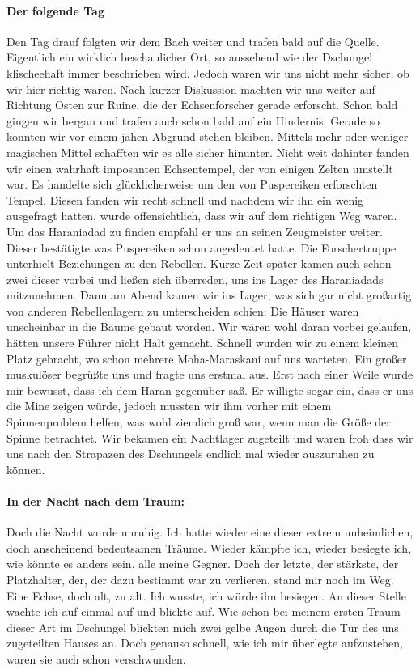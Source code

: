 \paragraph{Der folgende Tag}
Den Tag drauf folgten wir dem Bach weiter und trafen bald auf die Quelle. Eigentlich ein wirklich beschaulicher Ort, so aussehend wie der Dschungel klischeehaft immer beschrieben wird. Jedoch waren wir uns nicht mehr sicher, ob wir hier richtig waren. Nach kurzer Diskussion machten wir uns weiter auf Richtung Osten zur Ruine, die der Echsenforscher gerade erforscht. Schon bald gingen wir bergan und trafen auch schon bald auf ein Hindernis. Gerade so konnten wir vor einem jähen Abgrund stehen bleiben. Mittels mehr oder weniger magischen Mittel schafften wir es alle sicher hinunter. Nicht weit dahinter fanden wir einen wahrhaft imposanten Echsentempel, der von einigen Zelten umstellt war. Es handelte sich glücklicherweise um den von Puspereiken erforschten Tempel. Diesen fanden wir recht schnell und nachdem wir ihn ein wenig ausgefragt hatten, wurde offensichtlich, dass wir auf dem richtigen Weg waren. Um das Haraniadad zu finden empfahl er uns an seinen Zeugmeister weiter. Dieser bestätigte was Puspereiken schon angedeutet hatte. Die Forschertruppe unterhielt Beziehungen zu den Rebellen. Kurze Zeit später kamen auch schon zwei dieser vorbei und ließen sich überreden, uns ins Lager des Haraniadads mitzunehmen. Dann am Abend kamen wir ins Lager, was sich gar nicht großartig von anderen Rebellenlagern zu unterscheiden schien: Die Häuser waren unscheinbar in die Bäume gebaut worden. Wir wären wohl daran vorbei gelaufen, hätten unsere Führer nicht Halt gemacht. Schnell wurden wir zu einem kleinen Platz gebracht, wo schon mehrere Moha-Maraskani auf uns warteten. Ein großer muskulöser begrüßte uns und fragte uns erstmal aus. Erst nach einer Weile wurde mir bewusst, dass ich dem Haran gegenüber saß. Er willigte sogar ein, dass er uns die Mine zeigen würde, jedoch mussten wir ihm vorher mit einem Spinnenproblem helfen, was wohl ziemlich groß war, wenn man die Größe der Spinne betrachtet. Wir bekamen ein Nachtlager zugeteilt und waren froh dass wir uns nach den Strapazen des Dschungels endlich mal wieder auszuruhen zu können.

\paragraph{In der Nacht nach dem Traum:}
Doch die Nacht wurde unruhig. Ich hatte wieder eine dieser extrem unheimlichen, doch anscheinend bedeutsamen Träume. Wieder kämpfte ich, wieder besiegte ich, wie könnte es anders sein, alle meine Gegner. Doch der letzte, der stärkste, der Platzhalter, der, der dazu bestimmt war zu verlieren, stand mir noch im Weg. Eine Echse, doch alt, zu alt. Ich wusste, ich würde ihn besiegen.
An dieser Stelle wachte ich auf einmal auf und blickte auf. Wie schon bei meinem ersten Traum dieser Art im Dschungel blickten mich zwei gelbe Augen durch die Tür des uns zugeteilten Hauses an. Doch genauso schnell, wie ich mir überlegte aufzustehen, waren sie auch schon verschwunden.

